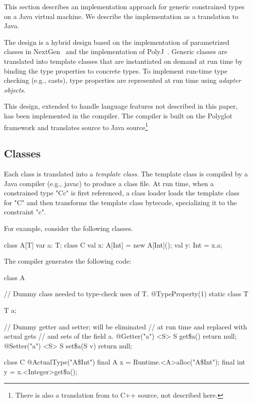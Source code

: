 This section describes an implementation approach for
generic constrained types on a Java virtual machine.
We describe the implementation as a translation to Java.

The design is a hybrid design based on the implementation of
parametrized classes in NextGen~\cite{allen03,allen04} and the
implementation of PolyJ~\cite{polyj}.  Generic classes are translated
into template classes that are instantiated on demand at run time by
binding the type properties to concrete types.  To implement run-time
type checking (e.g., casts), type properties are represented at run
time using \emph{adapter objects}.

This design, extended to handle language features
not described in this paper, has been implemented in the \Xten{}
compiler.  The \Xten{} compiler is built on the Polyglot framework
and translates \Xten{} source to Java source\footnote{There is also
a translation from \Xten{} to C++ source, not described here.}

\subsection{Classes}
Each class is translated into a \emph{template class}.
The template class is compiled by a Java compiler (e.g., javac)
to produce a class file.
At run time, when a constrained type \xcd"C{c}" is first referenced, a
class loader loads the template class for \xcd"C" and then transforms the
template class bytecode, specializing it to the constraint
\xcd"c".

For example, consider the following classes.
{\footnotesize
\begin{xten}
class A[T] {
    var a: T;
}
class C {
    val x: A[Int] = new A[Int]();
    val y: Int = x.a;
}
\end{xten}}

The compiler generates the following code:
{\footnotesize
\begin{xten}
class A {
    // Dummy class needed to type-check uses of T.
    @TypeProperty(1) static class T { }

    T a;

    // Dummy getter and setter; will be eliminated
    // at run time and replaced with actual gets
    // and sets of the field a.
    @Getter("a") <S> S get\$a() { return null; }
    @Setter("a") <S> S set\$a(S v) { return null; }
}

class C {
    @ActualType("A\$Int")
    final A x = Runtime.<A>alloc("A\$Int");
    final int y = x.<Integer>get\$a();
}
\end{xten}}

